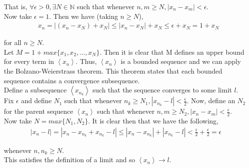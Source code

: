 \documentclass[12pt]{article}
\begin{document}
That is, $\forall \epsilon > 0, \exists N \in \mathbb{N}$ such that whenever $n, m \geq N, | x_n - x_m | < \epsilon$.\\

Now take $\epsilon = 1$. Then we have (taking $n \geq N$),
\begin{align*}
& x_n = | (x_n - x_N) + x_N | \leq | x_n - x_N | + x_N \leq \epsilon + x_N = 1 + x_N
\end{align*}

for all $n \geq N$.\\

Let $M = 1 + max\{x_1, x_2, ..., x_N\}$. Then it is clear that M defines an upper bound for every term in $\left<x_n\right>$. Thus, $\left<x_n\right>$ is a bounded sequence and we can apply the Bolzano-Weierstrass theorem. This theorem states that each bounded sequence contains a convergence subsequence.\\

Define a subsequence $\left<x_{n_k}\right>$ such that the sequence converges to some limit $l$. Fix $\epsilon$ and define $N_1$ such that whenever $n_k \geq N_1, | x_{n_k} - l | < \frac{\epsilon}{2}$. Now, define an $N_2$ for the parent sequence $\left<x_n\right>$ such that whenever $n, m \geq N_2, | x_n - x_m | < \frac{\epsilon}{2}$.\\

Now take $N = max\{N_1, N_2\}$. It is clear then that we have the following,
\begin{align*}
| x_n - l | = | x_n - x_{n_k} + x_{n_k} - l | \leq | x_n - x_{n_k} | + | x_{n_k} - l | < \frac{\epsilon}{2} + \frac{\epsilon}{2} = \epsilon
\end{align*}

whenever $n, n_k \geq N$.\\

This satisfies the definition of a limit and so $\left<x_n\right> \to l$.
\end{document}
